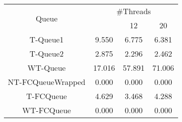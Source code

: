 \begin{tabular}{|c|c|c|c|}
\hline
\multirow{2}{*}{Queue} & \multicolumn{3}{c|}{\#Threads}\\\cline{2-4}& \quad 4 & 12 & 20\\
\hline
\hline
T-Queue1 & 9.550 & 6.775 & 6.381\\
T-Queue2 & 2.875 & 2.296 & 2.462\\
WT-Queue & 17.016 & 57.891 & 71.006\\
NT-FCQueueWrapped & 0.000 & 0.000 & 0.000\\
T-FCQueue & 4.629 & 3.468 & 4.288\\
WT-FCQueue & 0.000 & 0.000 & 0.000\\
\hline\end{tabular}
